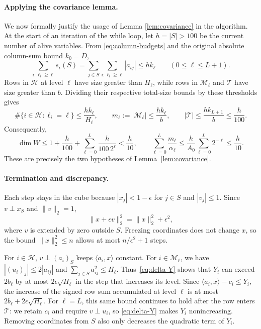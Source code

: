 \documentclass[reqno]{amsart}
\theoremstyle{definition}
\newcommand{\ip}[2]{\langle#1,#2\rangle}
\begin{document}
\paragraph{Applying the covariance lemma.}
We now formally justify the usage of Lemma \ref{lem:covariance} in the algorithm. At the start of an iteration of the while loop, let $h=|S|>100$ be the current number of alive variables. From \eqref{eq:column-budgets} and the original absolute column-sum bound $k_0=D$,
\[ \sum_{i:\ell_i\ge\ell}s_i(S) =\sum_{j\in S}\sum_{i:\ell_i\ge\ell}|a_{ij}| \le hk_\ell\qquad(0\le\ell\le L+1). \]
Rows in $\mathcal H$ at level $\ell$ have size greater than $H_\ell$, while rows in $\mathcal M_\ell$ and $\mathcal T$ have size greater than $b$. Dividing their respective total-size bounds by these thresholds gives
\[ \#\{i\in\mathcal H:\ell_i=\ell\}\le\frac{hk_\ell}{H_\ell}, \qquad m_\ell:=|\mathcal M_\ell|\le\frac{hk_\ell}{b}, \qquad |\mathcal T|\le\frac{hk_{L+1}}b\le\frac h{100}. \]
Consequently,
\[ \dim W\le1+\frac h{100} +\sum_{\ell=0}^L\frac h{100\,2^\ell}<\frac h{10}, \qquad \sum_{\ell=0}^L\frac{m_\ell}{\alpha_\ell} \le\frac h{A_0}\sum_{\ell=0}^L2^{-\ell}\le\frac h{10}. \]
These are precisely the two hypotheses of Lemma~\ref{lem:covariance}.

\paragraph{Termination and discrepancy.}
Each step stays in the cube because $|x_j|<1-\epsilon$ for $j\in S$ and $|v_j|\le1$. Since $v\perp x_S$ and $\|v\|_2=1$,
\begin{equation}\label{eq:norm-growth} \|x+\epsilon v\|_2^2=\|x\|_2^2+\epsilon^2, \end{equation}
where $v$ is extended by zero outside $S$. Freezing coordinates does not change $x$, so the bound $\|x\|_2^2\le n$ allows at most $n/\epsilon^2+1$ steps.

For $i\in\mathcal H$, $v\perp(a_i)_S$ keeps $\ip{a_i}{x}$ constant. For $i\in\mathcal M_\ell$, we have $|(u_i)_j|\le2|a_{ij}|$ and $\sum_{j\in S}a_{ij}^2\le H_\ell$. Thus~\eqref{eq:delta-Y} shows that $Y_i$ can exceed $2b_\ell$ by at most $2\epsilon\sqrt{H_\ell}$ in the step that increases its level. Since $\ip{a_i}{x}-c_i\le Y_i$, the increase of the signed row sum accumulated at level $\ell$ is at most $2b_\ell+2\epsilon\sqrt{H_\ell}$. For $\ell=L$, this same bound continues to hold after the row enters $\mathcal T$: we retain $c_i$ and require $v\perp u_i$, so \eqref{eq:delta-Y} makes $Y_i$ nonincreasing. Removing coordinates from $S$ also only decreases the quadratic term of $Y_i$.
\end{document}
